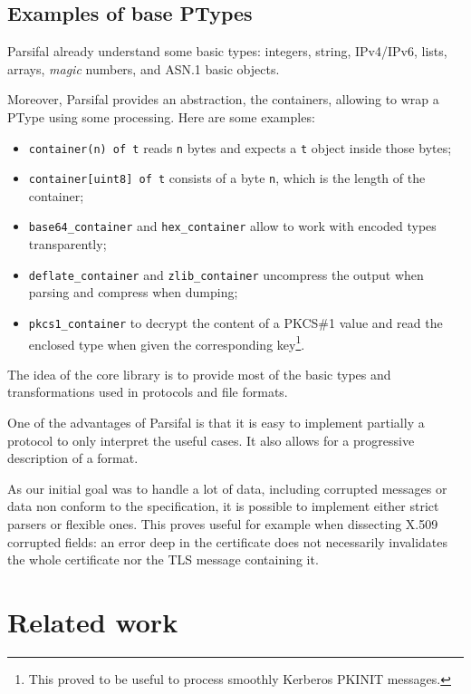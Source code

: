\documentclass{article}
\begin{document}
\subsection{Examples of base PTypes}

Parsifal already understand some basic types: integers, string,
IPv4/IPv6, lists, arrays, \emph{magic} numbers, and ASN.1 basic
objects.

Moreover, Parsifal provides an abstraction, the containers, allowing
to wrap a PType using some processing. Here are some examples:
\begin{itemize}
\item \texttt{container(n) of t} reads \texttt{n} bytes and expects a
  \texttt{t} object inside those bytes;
\item \texttt{container[uint8] of t} consists of a byte \texttt{n},
  which is the length of the container;
\item \texttt{base64\_container} and \texttt{hex\_container} allow to
  work with encoded types transparently;
\item \texttt{deflate\_container} and \texttt{zlib\_container}
  uncompress the output when parsing and compress when dumping;
\item \texttt{pkcs1\_container} to decrypt the content of a PKCS\#1
  value and read the enclosed type when given the corresponding
  key\footnote{This proved to be useful to process smoothly Kerberos
    PKINIT messages.}.
\end{itemize}

The idea of the core library is to provide most of the basic types and
transformations used in protocols and file formats.

One of the advantages of Parsifal is that it is easy to implement
partially a protocol to only interpret the useful cases. It also
allows for a progressive description of a format.

As our initial goal was to handle a lot of data, including corrupted
messages or data non conform to the specification, it is possible to
implement either strict parsers or flexible ones. This proves useful
for example when dissecting X.509 corrupted fields: an error deep in
the certificate does not necessarily invalidates the whole certificate
nor the TLS message containing it.



\section{Related work}
\end{document}
